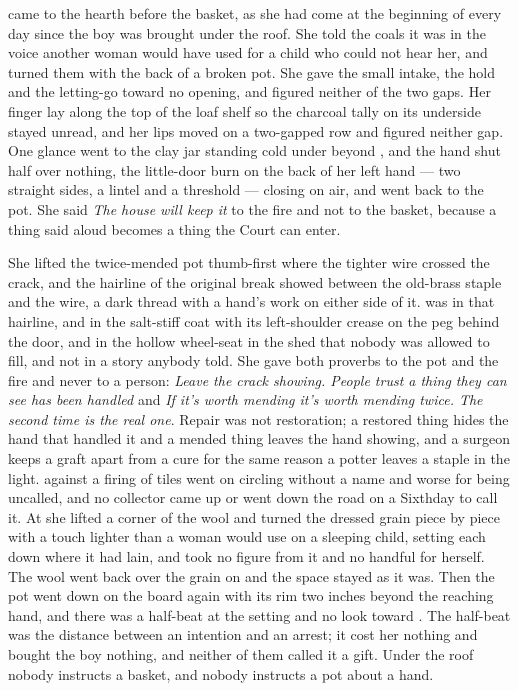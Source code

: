  came to the hearth before the basket, as she had come at the beginning of every day since the boy was brought under the roof. She told the coals it was  in the voice another woman would have used for a child who could not hear her, and turned them with the back of a broken pot. She gave the small intake, the hold and the letting-go toward no opening, and figured neither of the two gaps. Her finger lay along the top of the loaf shelf so the charcoal tally on its underside stayed unread, and her lips moved on a two-gapped row and figured neither gap. One glance went to the clay jar standing cold under  beyond , and the hand shut half over nothing, the little-door burn on the back of her left hand --- two straight sides, a lintel and a threshold --- closing on air, and went back to the pot. She said \emph{The house will keep it} to the fire and not to the basket, because a thing said aloud becomes a thing the Court can enter.

She lifted the twice-mended pot thumb-first where the tighter wire crossed the crack, and the hairline of the original break showed between the old-brass staple and the wire, a dark thread with a hand's work on either side of it.  was in that hairline, and in the salt-stiff coat with its left-shoulder crease on the peg behind the door, and in the hollow wheel-seat in the shed that nobody was allowed to fill, and not in a story anybody told. She gave both proverbs to the pot and the fire and never to a person: \emph{Leave the crack showing. People trust a thing they can see has been handled} and \emph{If it's worth mending it's worth mending twice. The second time is the real one}. Repair was not restoration; a restored thing hides the hand that handled it and a mended thing leaves the hand showing, and a surgeon keeps a graft apart from a cure for the same reason a potter leaves a staple in the light.  against a firing of tiles went on circling without a name and worse for being uncalled, and no collector came up or went down the road on a Sixthday to call it. At  she lifted a corner of the wool and turned the dressed grain piece by piece with a touch lighter than a woman would use on a sleeping child, setting each down where it had lain, and took no figure from it and no handful for herself. The wool went back over the grain on  and the space stayed as it was. Then the pot went down on the board again with its rim two inches beyond the reaching hand, and there was a half-beat at the setting and no look toward . The half-beat was the distance between an intention and an arrest; it cost her nothing and bought the boy nothing, and neither of them called it a gift. Under the roof nobody instructs a basket, and nobody instructs a pot about a hand.

